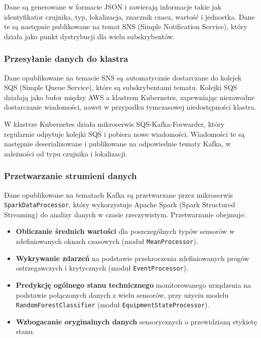 Dane są generowane w formacie JSON i zawierają informacje takie jak identyfikator czujnika, typ, lokalizacja, znacznik czasu, wartość i
jednostka. Dane te są następnie publikowane na temat SNS (Simple Notification Service), który działa jako punkt dystrybucji dla wielu subskrybentów.

\subsubsection{Przesyłanie danych do klastra}
\label{subsubsec:przesylanie_danych}

Dane opublikowane na temacie SNS są automatycznie dostarczane do kolejek SQS (Simple Queue Service), które są subskrybentami tematu. Kolejki SQS działają jako bufor między AWS a klastrem Kubernetes, zapewniając niezawodne dostarczanie wiadomości, nawet w przypadku tymczasowej niedostępności klastra.

W klastrze Kubernetes działa mikroserwis SQS-Kafka-Forwarder, który regularnie odpytuje kolejki SQS i pobiera nowe wiadomości. Wiadomości te są następnie deserializowane i publikowane na odpowiednie tematy Kafka, w zależności od typu czujnika i lokalizacji.

\subsubsection{Przetwarzanie strumieni danych}
\label{subsubsec:przetwarzanie_strumieni}

Dane opublikowane na tematach Kafka są przetwarzane przez mikroserwis \texttt{SparkDataProcessor}, który wykorzystuje Apache Spark (Spark Structured Streaming) do analizy danych w czasie rzeczywistym. Przetwarzanie obejmuje:

\begin{itemize}
    \item \textbf{Obliczanie średnich wartości} dla poszczególnych typów sensorów w zdefiniowanych oknach czasowych (moduł \texttt{MeanProcessor}).
    \item \textbf{Wykrywanie zdarzeń} na podstawie przekroczenia zdefiniowanych progów ostrzegawczych i krytycznych (moduł \texttt{EventProcessor}).
    \item \textbf{Predykcję ogólnego stanu technicznego} monitorowanego urządzenia na podstawie połączonych danych z wielu sensorów, przy użyciu modelu \texttt{RandomForestClassifier} (moduł \texttt{EquipmentStateProcessor}).
    \item \textbf{Wzbogacanie oryginalnych danych} sensorycznych o przewidzianą etykietę stanu.
\end{itemize}

